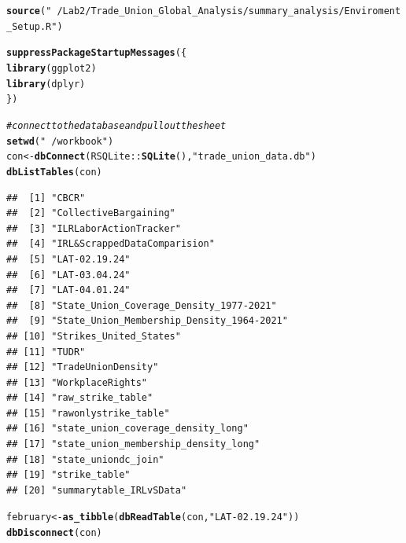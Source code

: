 \documentclass[11pt]{article}\usepackage[]{graphicx}\usepackage[]{xcolor}
\makeatletter
\newcommand{\hlstr}[1]{\textcolor[rgb]{0.192,0.494,0.8}{#1}}%
\newcommand{\hlcom}[1]{\textcolor[rgb]{0.678,0.584,0.686}{\textit{#1}}}%
\newcommand{\hlopt}[1]{\textcolor[rgb]{0,0,0}{#1}}%
\newcommand{\hlstd}[1]{\textcolor[rgb]{0.345,0.345,0.345}{#1}}%
\newcommand{\hlkwb}[1]{\textcolor[rgb]{0.69,0.353,0.396}{#1}}%
\newcommand{\hlkwd}[1]{\textcolor[rgb]{0.737,0.353,0.396}{\textbf{#1}}}%
\newenvironment{kframe}{%
 \def\at@end@of@kframe{}%
 \ifinner\ifhmode%
  \def\at@end@of@kframe{\end{minipage}}%
  \begin{minipage}{\columnwidth}%
 \fi\fi%
 \def\FrameCommand##1{\hskip\@totalleftmargin \hskip-\fboxsep
 \colorbox{shadecolor}{##1}\hskip-\fboxsep
     \hskip-\linewidth \hskip-\@totalleftmargin \hskip\columnwidth}%
 \MakeFramed {\advance\hsize-\width
   \@totalleftmargin\z@ \linewidth\hsize
   \@setminipage}}%
 {\par\unskip\endMakeFramed%
 \at@end@of@kframe}
\newenvironment{knitrout}{}{} %
\makeatother
\begin{document}
\begin{knitrout}
\color{fgcolor}\begin{kframe}
\begin{alltt}
\hlkwd{source}\hlstd{(}\hlstr{"~/Lab2/Trade_Union_Global_Analysis/summary_analysis/Enviroment_Setup.R"}\hlstd{)}

\hlkwd{suppressPackageStartupMessages}\hlstd{(\{}
  \hlkwd{library}\hlstd{(ggplot2)}
  \hlkwd{library}\hlstd{(dplyr)}
\hlstd{\})}

\hlcom{# connect to the database and pull out the sheet}
\hlkwd{setwd}\hlstd{(}\hlstr{"~/workbook"}\hlstd{)}
\hlstd{con} \hlkwb{<-} \hlkwd{dbConnect}\hlstd{(RSQLite}\hlopt{::}\hlkwd{SQLite}\hlstd{(),} \hlstr{"trade_union_data.db"}\hlstd{)}
\hlkwd{dbListTables}\hlstd{(con)}
\end{alltt}
\begin{verbatim}
##  [1] "CBCR"                                    
##  [2] "CollectiveBargaining"                    
##  [3] "ILRLaborActionTracker"                   
##  [4] "IRL&ScrappedDataComparision"             
##  [5] "LAT-02.19.24"                            
##  [6] "LAT-03.04.24"                            
##  [7] "LAT-04.01.24"                            
##  [8] "State_Union_Coverage_Density_1977-2021"  
##  [9] "State_Union_Membership_Density_1964-2021"
## [10] "Strikes_United_States"                   
## [11] "TUDR"                                    
## [12] "TradeUnionDensity"                       
## [13] "WorkplaceRights"                         
## [14] "raw_strike_table"                        
## [15] "rawonlystrike_table"                     
## [16] "state_union_coverage_density_long"       
## [17] "state_union_membership_density_long"     
## [18] "state_uniondc_join"                      
## [19] "strike_table"                            
## [20] "summarytable_IRLvSData"
\end{verbatim}
\begin{alltt}
\hlstd{february} \hlkwb{<-} \hlkwd{as_tibble}\hlstd{(}\hlkwd{dbReadTable}\hlstd{(con,} \hlstr{"LAT-02.19.24"}\hlstd{))}
\hlkwd{dbDisconnect}\hlstd{(con)}
\end{alltt}
\end{kframe}
\end{knitrout}
\end{document}

